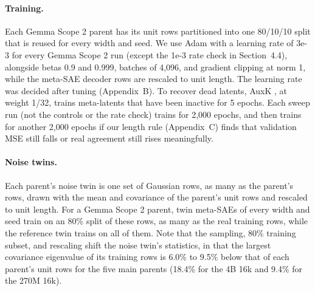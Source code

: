 \paragraph{Training.}
Each Gemma Scope 2 parent has its unit rows partitioned into one 80/10/10 split that is reused for every width and seed.
We use Adam \citep{kingma2015adam} with a learning rate of 3e-3 for every Gemma Scope 2 run (except the 1e-3 rate check in Section~4.4), alongside betas 0.9 and 0.999, batches of 4,096, and gradient clipping at norm 1, while the meta-SAE decoder rows are rescaled to unit length.
The learning rate was decided after tuning (Appendix~B).
To recover dead latents, AuxK \citep{gao2025scaling}, at weight 1/32, trains meta-latents that have been inactive for 5 epochs.
Each sweep run (not the controls or the rate check) trains for 2,000 epochs, and then trains for another 2,000 epochs if our length rule (Appendix~C) finds that validation MSE still falls or real agreement still rises meaningfully.

\paragraph{Noise twins.}
Each parent's noise twin is one set of Gaussian rows, as many as the parent's rows, drawn with the mean and covariance of the parent's unit rows and rescaled to unit length.
For a Gemma Scope 2 parent, twin meta-SAEs of every width and seed train on an 80\% split of these rows, as many as the real training rows, while the reference twin trains on all of them.
Note that the sampling, 80\% training subset, and rescaling shift the noise twin's statistics, in that the largest covariance eigenvalue of its training rows is 6.0\% to 9.5\% below that of each parent's unit rows for the five main parents (18.4\% for the 4B 16k and 9.4\% for the 270M 16k).

